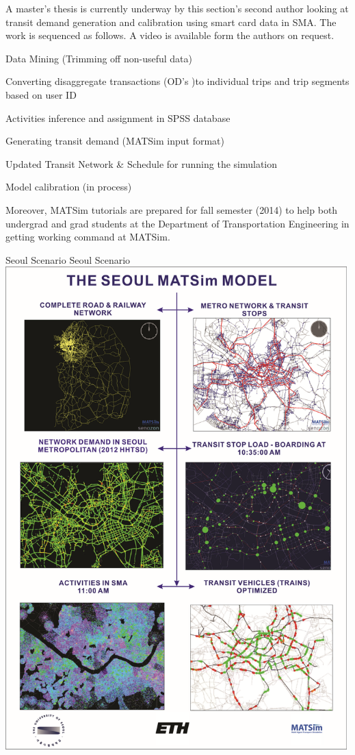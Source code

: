 A master's thesis is currently underway by this section's second author looking at transit demand generation and calibration using smart card data in SMA. The work is sequenced as follows. A video is available form the authors on request.
%
\begin{compactitem}
\item Data Mining (Trimming off non-useful data)
\item	Converting disaggregate transactions (OD’s )to individual trips and trip segments based on user ID
\item	Activities inference and assignment in SPSS database
\item	Generating transit demand (MATSim input format)
\item	Updated Transit Network \& Schedule for running the simulation
\item	Model calibration (in process)
\end{compactitem}
%
Moreover, MATSim tutorials are prepared for fall semester (2014) to help both undergrad and grad students at the Department of Transportation Engineering in getting working command at MATSim.

\createfigure%
{Seoul Scenario}%
{Seoul Scenario}%
{\label{fig:seoul}}%
{\includegraphics[width=0.99\textwidth, angle=0]{using/figures/seoul}}%
{}

 
 
